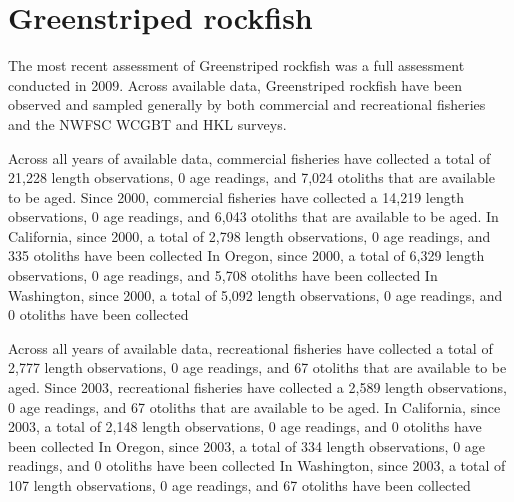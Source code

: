 \documentclass[11pt,
  english,
  letterpaper,
]{article}
\begin{document}

\hypertarget{greenstriped-rockfish}{%
\section{Greenstriped rockfish}\label{greenstriped-rockfish}}

\leavevmode\tagmcend\tagstructend


The most recent assessment of Greenstriped rockfish was a full assessment conducted in 2009. Across available data, Greenstriped rockfish have been observed and sampled generally by both commercial and recreational fisheries and the NWFSC WCGBT and HKL surveys.

\leavevmode\tagmcend\tagstructend\par


Across all years of available data, commercial fisheries have collected a total of 21,228 length observations, 0 age readings, and 7,024 otoliths that are available to be aged. Since 2000, commercial fisheries have collected a 14,219 length observations, 0 age readings, and 6,043 otoliths that are available to be aged. In California, since 2000, a total of 2,798 length observations, 0 age readings, and 335 otoliths have been collected In Oregon, since 2000, a total of 6,329 length observations, 0 age readings, and 5,708 otoliths have been collected In Washington, since 2000, a total of 5,092 length observations, 0 age readings, and 0 otoliths have been collected

\leavevmode\tagmcend\tagstructend\par


Across all years of available data, recreational fisheries have collected a total of 2,777 length observations, 0 age readings, and 67 otoliths that are available to be aged. Since 2003, recreational fisheries have collected a 2,589 length observations, 0 age readings, and 67 otoliths that are available to be aged. In California, since 2003, a total of 2,148 length observations, 0 age readings, and 0 otoliths have been collected In Oregon, since 2003, a total of 334 length observations, 0 age readings, and 0 otoliths have been collected In Washington, since 2003, a total of 107 length observations, 0 age readings, and 67 otoliths have been collected
\end{document}
